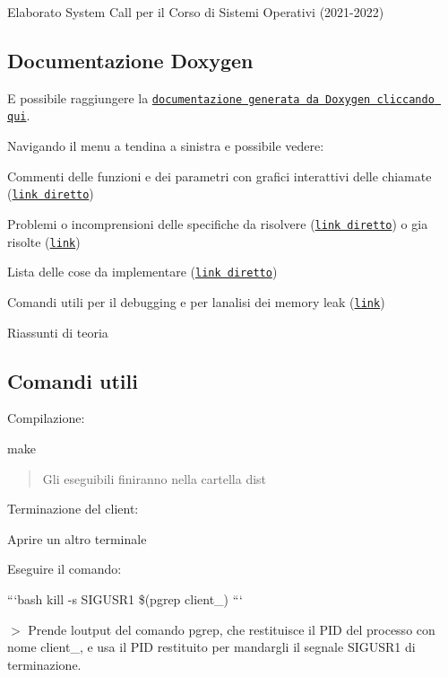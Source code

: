 Elaborato System Call per il Corso di Sistemi Operativi (2021-\/2022)

\subsection*{Documentazione Doxygen}

E\textquotesingle{} possibile raggiungere la \href{https://zfd-progetti-univr-2021-2022.github.io/system_call/doxygen/html/index.html}{\tt documentazione generata da Doxygen cliccando qui}.

Navigando il menu\textquotesingle{} a tendina a sinistra e\textquotesingle{} possibile vedere\+:
\begin{DoxyItemize}
\item Commenti delle funzioni e dei parametri con grafici interattivi delle chiamate (\href{https://zfd-progetti-univr-2021-2022.github.io/system_call/doxygen/html/files.html}{\tt link diretto})
\item Problemi o incomprensioni delle specifiche da risolvere (\href{https://zfd-progetti-univr-2021-2022.github.io/system_call/doxygen/html/warning.html}{\tt link diretto}) o gia\textquotesingle{} risolte (\href{https://zfd-progetti-univr-2021-2022.github.io/system_call/doxygen/html/md_theory_questions_questions.html}{\tt link})
\item Lista delle cose da implementare (\href{https://zfd-progetti-univr-2021-2022.github.io/system_call/doxygen/html/todo.html}{\tt link diretto})
\item Comandi utili per il debugging e per l\textquotesingle{}analisi dei memory leak (\href{https://zfd-progetti-univr-2021-2022.github.io/system_call/doxygen/html/md_theory_commands_commands.html}{\tt link})
\item Riassunti di teoria
\end{DoxyItemize}

\subsection*{Comandi utili}

Compilazione\+: 
\begin{DoxyCode}
make
\end{DoxyCode}
 \begin{quote}
Gli eseguibili finiranno nella cartella {\ttfamily dist} \end{quote}


Terminazione del client\+:
\begin{DoxyEnumerate}
\item Aprire un altro terminale
\item Eseguire il comando\+:

```bash kill -\/s S\+I\+G\+U\+S\+R1 \$(pgrep client\+\_) ```

$>$ Prende l\textquotesingle{}output del comando pgrep, che restituisce il P\+ID del processo con nome client\+\_, e usa il P\+ID restituito per mandargli il segnale S\+I\+G\+U\+S\+R1 di terminazione.
\end{DoxyEnumerate}

